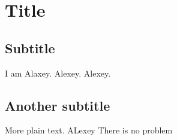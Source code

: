 \documentclass{article}
\begin{document}
\section{Title}

\subsection{Subtitle}
I am Alaxey. Alexey. Alexey.
\subsection{Another subtitle}

More plain text. ALexey
There is no problem
\end{document}
